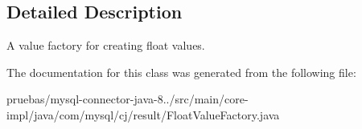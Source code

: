 \subsection{Detailed Description}
A value factory for creating float values. 

The documentation for this class was generated from the following file\+:\begin{DoxyCompactItemize}
\item 
pruebas/mysql-\/connector-\/java-\/8../src/main/core-\/impl/java/com/mysql/cj/result/Float\+Value\+Factory.\+java\end{DoxyCompactItemize}
